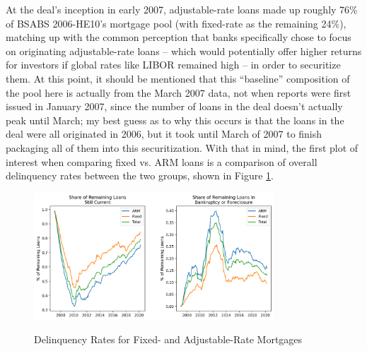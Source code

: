 \documentclass[12pt]{article}
\begin{document}
At the deal’s inception in early 2007, adjustable-rate loans made up roughly 76\% of BSABS 2006-HE10’s mortgage pool (with fixed-rate as the remaining 24\%), matching up with the common perception that banks specifically chose to focus on originating adjustable-rate loans – which would potentially offer higher returns for investors if global rates like LIBOR remained high – in order to securitize them. At this point, it should be mentioned that this “baseline” composition of the pool here is actually from the March 2007 data, not when reports were first issued in January 2007, since the number of loans in the deal doesn’t actually peak until March; my best guess as to why this occurs is that the loans in the deal were all originated in 2006, but it took until March of 2007 to finish packaging all of them into this securitization. With that in mind, the first plot of interest when comparing fixed vs. ARM loans is a comparison of overall delinquency rates between the two groups, shown in Figure \ref{fig:timeseries_delinq_stats_fixed_vs_arm}.

\begin{figure}[h]
	\centering
	\caption{Delinquency Rates for Fixed- and Adjustable-Rate Mortgages}
	\includegraphics[width=0.8\textwidth]{../figures/timeseries_delinq_status_fixed_vs_arm}
	\label{fig:timeseries_delinq_stats_fixed_vs_arm}
\end{figure}
\end{document}
